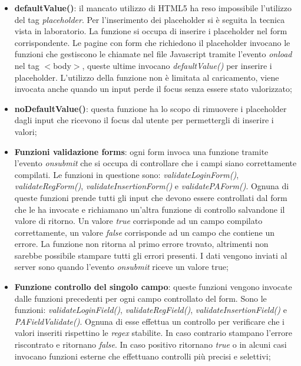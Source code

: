 \begin{itemize}
    \item \textbf{defaultValue()}: il mancato utilizzo di HTML5 ha reso impossibile l'utilizzo del tag \textit{placeholder}. Per l'inserimento dei placeholder si è seguita la tecnica vista in laboratorio. La funzione si occupa di inserire i placeholder nel form corrispondente. Le pagine con form che richiedono il placeholder invocano le funzioni che gestiscono le chiamate nel file Javascript tramite l'evento \textit{onload} nel tag  $<$body$>$, queste ultime invocano \textit{defaultValue()} per inserire i placeholder.
    L'utilizzo della funzione non è limitata al caricamento, viene invocata anche quando un input perde il focus senza essere stato valorizzato;
    
    \item \textbf{noDefaultValue()}: questa funzione ha lo scopo di rimuovere i placeholder dagli input che ricevono il focus dal utente per permettergli di inserire i valori;
    
    \item \textbf{Funzioni validazione forms}: ogni form invoca una funzione tramite l'evento \textit{onsubmit} che si occupa di controllare che i campi siano correttamente compilati. Le funzioni in questione sono: \textit{validateLoginForm()}, \textit{validateRegForm()}, \textit{validateInsertionForm()} e \textit{validatePAForm()}. Ognuna di queste funzioni prende tutti gli input che devono essere controllati dal form che le ha invocate e richiamano un'altra funzione di controllo salvandone il valore di ritorno. Un valore \textit{true} corrisponde ad un campo compilato correttamente, un valore \textit{false} corrisponde ad un campo che contiene un errore. La funzione non ritorna al primo errore trovato, altrimenti non sarebbe possibile stampare tutti gli errori presenti. I dati vengono inviati al server sono quando l'evento \textit{onsubmit} riceve un valore true;
    
    \item \textbf{Funzione controllo del singolo campo}: queste funzioni vengono invocate dalle funzioni precedenti per ogni campo controllato del form. 
    Sono le funzioni: \textit{validateLoginField()}, \textit{validateRegField()}, \textit{validateInsertionField()} e \textit{PAFieldValidate()}. Ognuna di esse effettua un controllo per verificare che i valori inseriti rispettino le \textit{regex} stabilite. In caso contrario stampano l'errore riscontrato e ritornano \textit{false}. In caso positivo ritornano \textit{true} o in alcuni casi invocano funzioni esterne che effettuano controlli più precisi e selettivi;
    

\end{itemize}
